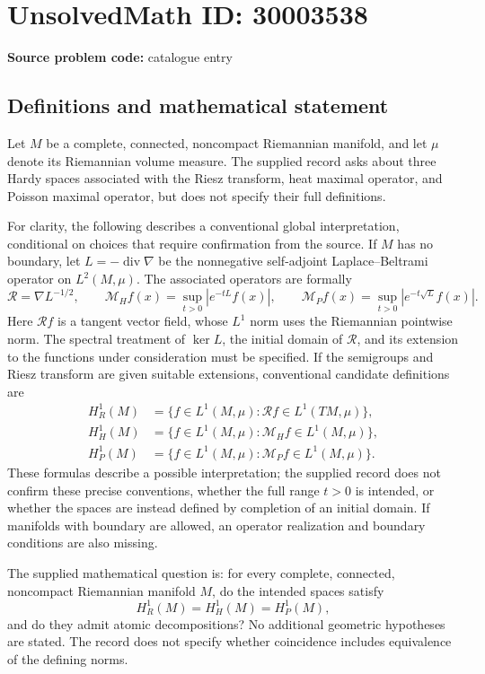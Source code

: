 \documentclass[11pt]{article}
\begin{document}
\section*{UnsolvedMath ID: 30003538}
\textbf{Source problem code:} catalogue entry
\subsection{Definitions and mathematical statement}
Let \(M\) be a complete, connected, noncompact Riemannian manifold, and let \(\mu\) denote its Riemannian volume measure. The supplied record asks about three Hardy spaces associated with the Riesz transform, heat maximal operator, and Poisson maximal operator, but does not specify their full definitions.

For clarity, the following describes a conventional global interpretation, conditional on choices that require confirmation from the source. If \(M\) has no boundary, let \(L=-\operatorname{div}\nabla\) be the nonnegative self-adjoint Laplace--Beltrami operator on \(L^2(M,\mu)\). The associated operators are formally
\[
\mathcal R=\nabla L^{-1/2},\qquad
\mathcal M_H f(x)=\sup_{t>0}|e^{-tL}f(x)|,\qquad
\mathcal M_P f(x)=\sup_{t>0}|e^{-t\sqrt L}f(x)|.
\]
Here \(\mathcal Rf\) is a tangent vector field, whose \(L^1\) norm uses the Riemannian pointwise norm. The spectral treatment of \(\ker L\), the initial domain of \(\mathcal R\), and its extension to the functions under consideration must be specified. If the semigroups and Riesz transform are given suitable extensions, conventional candidate definitions are
\[
\begin{aligned}
H_R^1(M)&=\{f\in L^1(M,\mu):\mathcal Rf\in L^1(TM,\mu)\},\\
H_H^1(M)&=\{f\in L^1(M,\mu):\mathcal M_Hf\in L^1(M,\mu)\},\\
H_P^1(M)&=\{f\in L^1(M,\mu):\mathcal M_Pf\in L^1(M,\mu)\}.
\end{aligned}
\]
These formulas describe a possible interpretation; the supplied record does not confirm these precise conventions, whether the full range \(t>0\) is intended, or whether the spaces are instead defined by completion of an initial domain. If manifolds with boundary are allowed, an operator realization and boundary conditions are also missing.

The supplied mathematical question is: for every complete, connected, noncompact Riemannian manifold \(M\), do the intended spaces satisfy
\[
H_R^1(M)=H_H^1(M)=H_P^1(M),
\]
and do they admit atomic decompositions? No additional geometric hypotheses are stated. The record does not specify whether coincidence includes equivalence of the defining norms.
\end{document}
